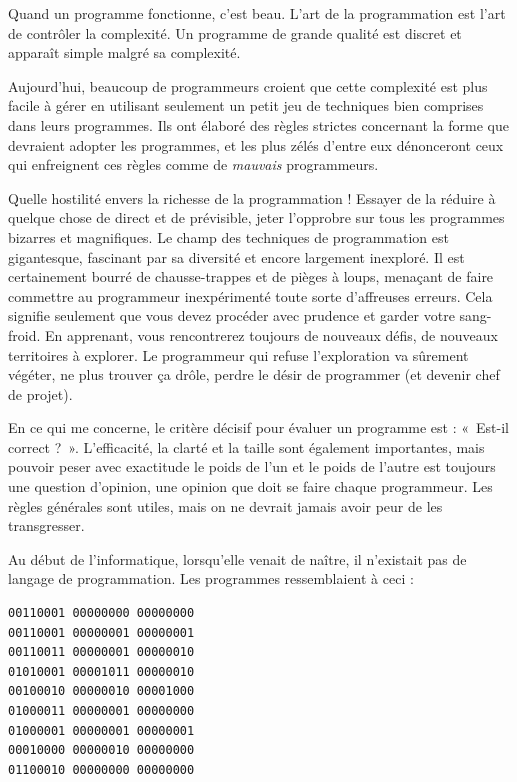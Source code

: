 \documentclass{FramateX}
\begin{document}
Quand un programme fonctionne, c'est beau. L'art de la programmation est
l'art de contrôler la complexité. Un programme de grande qualité est
discret et apparaît simple malgré sa complexité.

\begin{center}\end{center}

Aujourd'hui, beaucoup de programmeurs croient que cette complexité est
plus facile à gérer en utilisant seulement un petit jeu de techniques
bien comprises dans leurs programmes. Ils ont élaboré des règles
strictes concernant la forme que devraient adopter les programmes, et
les plus zélés d'entre eux dénonceront ceux qui enfreignent ces règles
comme de \emph{mauvais} programmeurs.

Quelle hostilité envers la richesse de la programmation ! Essayer de la
réduire à quelque chose de direct et de prévisible, jeter l'opprobre sur
tous les programmes bizarres et magnifiques. Le champ des techniques de
programmation est gigantesque, fascinant par sa diversité et encore
largement inexploré. Il est certainement bourré de chausse-trappes et de
pièges à loups, menaçant de faire commettre au programmeur inexpérimenté
toute sorte d'affreuses erreurs. Cela signifie seulement que vous devez
procéder avec prudence et garder votre sang-froid. En apprenant, vous
rencontrerez toujours de nouveaux défis, de nouveaux territoires à
explorer. Le programmeur qui refuse l'exploration va sûrement végéter,
ne plus trouver ça drôle, perdre le désir de programmer (et devenir chef
de projet).

En ce qui me concerne, le critère décisif pour évaluer un programme est
: «~Est-il correct ?~». L'efficacité, la clarté et la taille sont
également importantes, mais pouvoir peser avec exactitude le poids de
l'un et le poids de l'autre est toujours une question d'opinion, une
opinion que doit se faire chaque programmeur. Les règles générales sont
utiles, mais on ne devrait jamais avoir peur de les transgresser.

\begin{center}\end{center}

Au début de l'informatique, lorsqu'elle venait de naître, il n'existait
pas de langage de programmation. Les programmes ressemblaient à ceci :

\begin{lstlisting}
00110001 00000000 00000000
00110001 00000001 00000001
00110011 00000001 00000010
01010001 00001011 00000010
00100010 00000010 00001000
01000011 00000001 00000000
01000001 00000001 00000001
00010000 00000010 00000000
01100010 00000000 00000000
\end{lstlisting}
\end{document}
